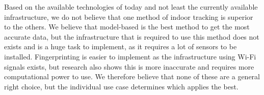 Based on the available technologies of today and not least the currently available infrastructure, we do not believe that one method of indoor tracking is superior to the others.
We believe that model-based is the best method to get the most accurate data, but the infrastructure that is required to use this method does not exists and is a huge task to implement, as it requires a lot of sensors to be installed. 
Fingerprinting is easier to implement as the infrastructure using Wi-Fi signals exists, but research also shows this is more inaccurate and requires more computational power to use. 
We therefore believe that none of these are a general right choice, but the individual use case determines which applies the best. 

